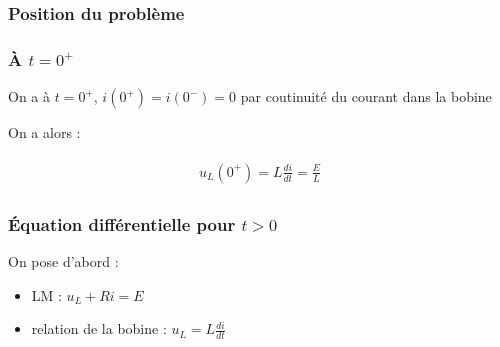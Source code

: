 \documentclass{article}
\begin{document}
\subsubsection{Position du problème}



\subsubsection{À $t=0^+$}

On a à $t=0^+$, $i(0^+)=i(0^-)=0$ par coutinuité du courant dans la bobine




On a alors :

\begin{align*}\begin{split}
    u_L(0^+) = L\frac{di}{dt}=\frac{E}{L}
\end{split}\end{align*}

\subsubsection{Équation différentielle pour $t>0$}

On pose d'abord :

\begin{itemize}
    \item LM : $u_L+Ri=E$
    \item relation de la bobine : $u_L=L\frac{di}{dt}$
\end{itemize}
\end{document}
